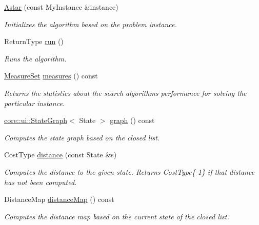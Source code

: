 \begin{DoxyCompactItemize}
\item 
\hyperlink{structslb_1_1ext_1_1algorithm_1_1Astar_a2d3050a9cc4dddc9f48b7c42d11d68c9}{Astar} (const My\+Instance \&instance)
\begin{DoxyCompactList}\small\item\em Initializes the algorithm based on the problem instance. \end{DoxyCompactList}\item 
Return\+Type \hyperlink{structslb_1_1ext_1_1algorithm_1_1Astar_af46d0fe401539d7ae297dc4d059f5b5f}{run} ()
\begin{DoxyCompactList}\small\item\em Runs the algorithm. \end{DoxyCompactList}\item 
\hyperlink{structslb_1_1core_1_1sb_1_1MeasureSet}{Measure\+Set} \hyperlink{structslb_1_1ext_1_1algorithm_1_1Astar_a936b71c860389ebadb17ee8afaba875f}{measures} () const 
\begin{DoxyCompactList}\small\item\em Returns the statistics about the search algorithm\textquotesingle{}s performance for solving the particular instance. \end{DoxyCompactList}\item 
\hyperlink{structslb_1_1core_1_1ui_1_1StateGraph}{core\+::ui\+::\+State\+Graph}$<$ State $>$ \hyperlink{structslb_1_1ext_1_1algorithm_1_1Astar_a15d6101b6dc84cb71e290c3fcdcb44b9}{graph} () const 
\begin{DoxyCompactList}\small\item\em Computes the state graph based on the closed list. \end{DoxyCompactList}\item 
Cost\+Type \hyperlink{structslb_1_1ext_1_1algorithm_1_1Astar_a67abf0fa88aebf52c644731701a0dd70}{distance} (const State \&s)
\begin{DoxyCompactList}\small\item\em Computes the distance to the given state. Returns Cost\+Type\{-\/1\} if that distance has not been computed. \end{DoxyCompactList}\item 
Distance\+Map \hyperlink{structslb_1_1ext_1_1algorithm_1_1Astar_a2c129f68cc11d10fefa4fa40d58ba6a2}{distance\+Map} () const 
\begin{DoxyCompactList}\small\item\em Computes the distance map based on the current state of the closed list. \end{DoxyCompactList}\end{DoxyCompactItemize}
